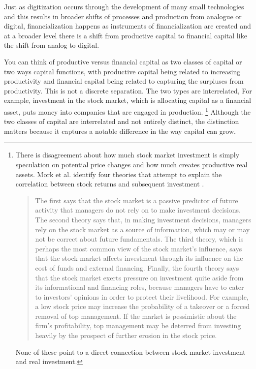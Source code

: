 Just as digitization occurs through the development of many small technologies and this results in %
broader shifts of processes and production from analogue or digital, financialization happens as instruments of financialization are created and at a broader level there is a shift from productive capital to financial capital like the shift from analog to digital. 

You can think of productive versus financial capital as two classes of capital or two ways capital functions, with productive capital being related to increasing productivity and financial capital being related to capturing the surpluses from productivity. This is not a discrete separation. The two types are interrelated, For example, investment in the stock market, which is allocating capital as a financial asset, puts money into companies that are engaged in production. \footnote{There is disagreement about how much stock market investment is simply speculation on potential price changes and how much creates productive real assets. Mork et al. identify four theories that attempt to explain the correlation between stock returns and subsequent investment \cite{morckStockMarketInvestment1990}. \begin{quotation}The first says that the stock market is a passive predictor of future activity that managers do not rely on to make investment decisions. The second theory says that, in making investment decisions, managers rely on the stock market as a source of information, which may or may not be correct about future fundamentals. The third theory, which is perhaps the most common view of the stock market's influence, says that the stock market affects investment through its influence on the cost of funds and external financing. Finally, the fourth theory says that the stock market exerts pressure on investment quite aside from its informational and financing roles, because managers have to cater to investors' opinions in order to protect their livelihood. For example, a low stock price may increase the probability of a takeover or a forced removal of top management. If the market is pessimistic about the firm's profitability, top management may be deterred from investing heavily by the prospect of further erosion in the stock price.\end{quotation} None of these point to a direct connection between stock market investment and real investment.}  Although the two classes of capital are interrelated and not entirely distinct, the distinction matters because it captures a notable difference in the way capital can grow. 

